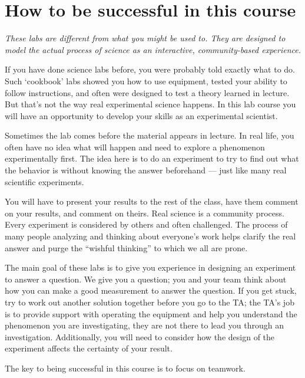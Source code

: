 \section*{How to be successful in this course}
\begin{center}
\begin{large}
 \emph{These labs are different from what you might be used to.
They are designed to model the actual process of science as an interactive, community-based experience.}
\end{large}
\end{center}
\par
If you have done science labs before, you were probably told exactly what to do.
Such `cookbook' labs showed you how to use equipment, tested your ability to follow instructions, and often were designed to test a theory learned in lecture.
But that's not the way real experimental science happens.
In this lab course you will have an opportunity to develop your skills as an experimental scientist. 
\par
Sometimes the lab comes before the material appears in lecture.
In real life, you often have no idea what will happen and need to explore a phenomenon experimentally first.
The idea here is to do an experiment to try to find out what the behavior is without knowing the answer beforehand — just like many real scientific experiments.
\par
You will have to present your results to the rest of the class, have them comment on your results, and comment on theirs.
Real science is a community process.
Every experiment is considered by others and often challenged.
The process of many people analyzing and thinking about everyone's work helps clarify the real answer and purge the ``wishful thinking'' to which we all are prone.
\par 
The main goal of these labs is to give you experience in designing an experiment to answer a question.
We give you a question; you and your team think about how you can make a good measurement to answer the question.
If you get stuck, try to work out another solution together before you go to the TA; the TA's job is to provide support with operating the equipment and help you understand the phenomenon you are investigating, they are not there to lead you through an investigation.
Additionally, you will need to consider how the design of the experiment affects the certainty of your result.
\par
The key to being successful in this course is to focus on teamwork.

